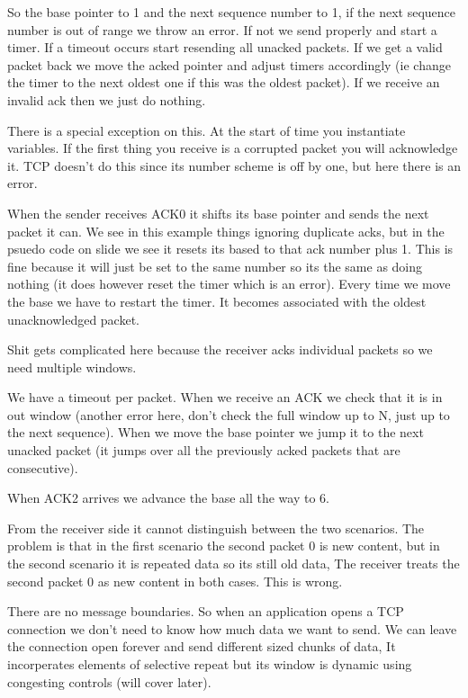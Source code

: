 \documentclass{article}
\begin{document}

So the base pointer to 1 and the next sequence number to 1, if the next sequence number is out of range we throw an error. If not we send properly and start a timer. If a timeout occurs start resending all unacked packets. If we get a valid packet back we move the acked pointer and adjust timers accordingly (ie change the timer to the next oldest one if this was the oldest packet). If we receive an invalid ack then we just do nothing.


There is a special exception on this. At the start of time you instantiate variables. If the first thing you receive is a corrupted packet you will acknowledge it. TCP doesn't do this since its number scheme is off by one, but here there is an error. 


When the sender receives ACK0 it shifts its base pointer and sends the next packet it can. We see in this example things ignoring duplicate acks, but in the psuedo code on slide we see it resets its based to that ack number plus 1. This is fine because it will just be set to the same number so its the same as doing nothing (it does however reset the timer which is an error). Every time we move the base we have to restart the timer. It becomes associated with the oldest unacknowledged packet.


Shit gets complicated here because the receiver acks individual packets so we need multiple windows.



We have a timeout per packet. When we receive an ACK we check that it is in out window (another error here, don't check the full window up to N, just up to the next sequence). When we move the base pointer we jump it to the next unacked packet (it jumps over all the previously acked packets that are consecutive).


When ACK2 arrives we advance the base all the way to 6.


From the receiver side it cannot distinguish between the two scenarios. The problem is that in the first scenario the second packet 0 is new content, but in the second scenario it is repeated data so its still old data, The receiver treats the second packet 0 as new content in both cases. This is wrong.



There are no message boundaries. So when an application opens a TCP connection we don't need to know how much data we want to send. We can leave the connection open forever and send different sized chunks of data, It incorperates elements of selective repeat but its window is dynamic using congesting controls (will cover later). 
\end{document}
